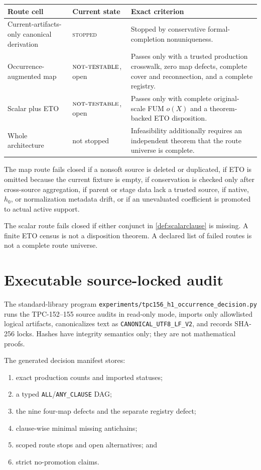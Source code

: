 \documentclass[11pt]{article}
\theoremstyle{definition}
\theoremstyle{remark}
\numberwithin{equation}{section}
\newcommand{\NT}{\textnormal{\textsc{not-testable}}}
\begin{document}
\begin{center}
\small
\begin{tabularx}{\textwidth}{@{}P{0.26\textwidth}P{0.17\textwidth}Y@{}}
\toprule
Route cell & Current state & Exact criterion\\
\midrule
Current-artifacts-only canonical derivation
& \textsc{stopped}
& Stopped by conservative formal-completion nonuniqueness.\\
Occurrence-augmented map
& \(\NT\), open
& Passes only with a trusted production crosswalk, zero map defects,
  complete cover and reconnection, and a complete registry.\\
Scalar plus ETO
& \(\NT\), open
& Passes only with complete original-scale FUM \(o(X)\) and a
  theorem-backed ETO disposition.\\
Whole architecture
& not stopped
& Infeasibility additionally requires an independent theorem that
  the route universe is complete.\\
\bottomrule
\end{tabularx}
\end{center}

The map route fails closed if a nonsoft source is deleted or
duplicated, if ETO is omitted because the current fixture is empty,
if conservation is checked only after cross-source aggregation, if
parent or stage data lack a trusted source, if native, \(h_0\), or
normalization metadata drift, or if an unevaluated coefficient is
promoted to actual active support.

The scalar route fails closed if either conjunct in
\cref{def:scalarclause} is missing.  A finite ETO census is not a
disposition theorem.  A declared list of failed routes is not a
complete route universe.

\section{Executable source-locked audit}

The standard-library program
\texttt{experiments/tpc156\_h1\_occurrence\_decision.py} runs the
TPC-152--155 source audits in read-only mode, imports only allowlisted
logical artifacts, canonicalizes text as
\texttt{CANONICAL\_UTF8\_LF\_V2}, and records SHA-256 locks.  Hashes
have integrity semantics only; they are not mathematical proofs.

The generated decision manifest stores:
\begin{enumerate}[label=(\roman*),leftmargin=2.2em,itemsep=0.15em]
\item exact production counts and imported statuses;
\item a typed \texttt{ALL}/\texttt{ANY\_CLAUSE} DAG;
\item the nine four-map defects and the separate registry defect;
\item clause-wise minimal missing antichains;
\item scoped route stops and open alternatives; and
\item strict no-promotion claims.
\end{enumerate}
\end{document}
